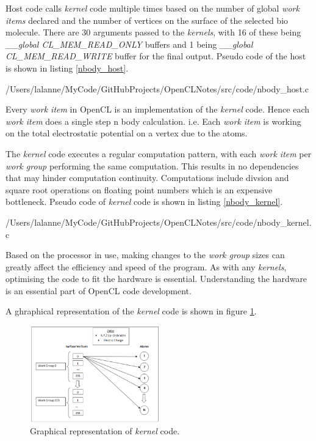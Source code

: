\par{Host code calls \emph{kernel} code multiple times based on the 
    number of global \emph{work items} declared and the number of vertices 
    on the surface of the selected bio molecule. There are 30 arguments 
    passed to the \emph{kernels}, with 16 of these being 
    \emph{\_\_global CL\_MEM\_READ\_ONLY}
    buffers and 1 being \emph{\_\_global CL\_MEM\_READ\_WRITE} buffer 
    for the final output. Pseudo code of the host is shown in listing 
    \ref{nbody_host}.}


                {/Users/lalanne/MyCode/GitHubProjects/OpenCLNotes/src/code/nbody_host.c}

\par{Every \emph{work item} in OpenCL is an implementation of the \emph{kernel} code. 
    Hence each \emph{work item} does a single step n body calculation. 
    i.e. Each \emph{work item} is working on the total electrostatic 
    potential on a vertex due to the atoms.}

\par{The \emph{kernel} code executes a regular computation pattern, 
    with each \emph{work item} per \emph{work group} performing the same computation. 
    This results in no dependencies that may hinder computation continuity. 
    Computations include divsion and square root operations on floating point 
    numbers which is an expensive bottleneck. Pseudo code of \emph{kernel} code
    is shown in listing \ref{nbody_kernel}.}


                {/Users/lalanne/MyCode/GitHubProjects/OpenCLNotes/src/code/nbody_kernel.c}

\par{Based on the processor in use, making changes to the \emph{work group} sizes 
    can greatly affect the efficiency and speed of the program. 
    As with any \emph{kernels}, optimising the code to fit the hardware is essential. 
    Understanding the hardware is an essential part of OpenCL 
    code development.}

\par{A ghraphical representation of the \emph{kernel} code is shown in figure 
    \ref{nbody_graph}.}

\begin{figure}[!h]
    \centering
    \includegraphics[width=0.5\textwidth]{figures/graph_nbody.png}
    \caption{Graphical representation of \emph{kernel} code.}
    \label{nbody_graph}
\end{figure}






